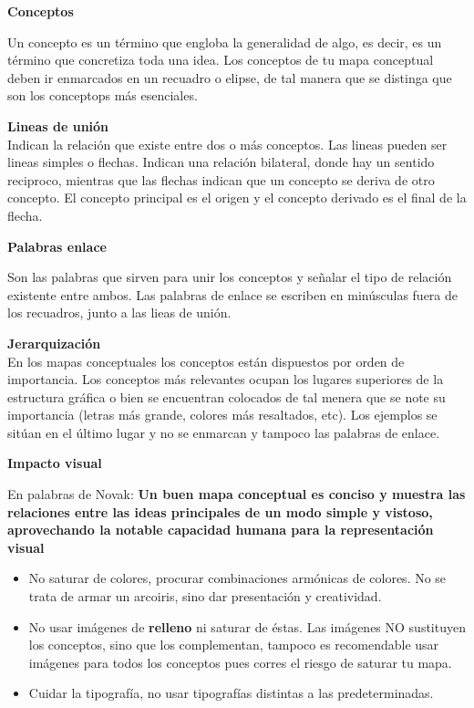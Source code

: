 \documentclass[
	11pt, %
]{beamer}
\begin{document}
\begin{frame}
  \textbf{Conceptos}
  \bigskip %

  Un concepto es un término que engloba la generalidad de algo, es decir, es un término que concretiza toda una idea. Los conceptos de tu mapa conceptual deben ir enmarcados en un recuadro o elipse, de tal manera que se distinga que son los conceptops más esenciales.

  \bigskip %
  \textbf{Lineas de unión}\\
  \bigskip %
  Indican la relación que existe entre dos o más conceptos. Las lineas pueden ser lineas simples o flechas. Indican una relación bilateral, donde hay un sentido reciproco, mientras que las flechas indican que un concepto se deriva de otro concepto. El concepto principal es el origen y el concepto derivado es el final de la flecha.
  
\end{frame}

\begin{frame}
  \textbf{Palabras enlace}
  \bigskip %

  Son las palabras que sirven para unir los conceptos y señalar el tipo de relación existente entre ambos. Las palabras de enlace se escriben en minúsculas fuera de los recuadros, junto a las lieas de unión.

  \bigskip %
  \textbf{Jerarquización}\\
  \bigskip %
  En los mapas conceptuales los conceptos están dispuestos por orden de importancia. Los conceptos más relevantes ocupan los lugares superiores de la estructura gráfica o bien se encuentran colocados de tal menera que se note su importancia (letras más grande, colores más resaltados, etc). Los ejemplos se sitúan en el último lugar y no se enmarcan y tampoco las palabras de enlace.
  
\end{frame}

\begin{frame}
  \textbf{Impacto visual}
  \bigskip %

  En palabras de Novak: \textbf{Un buen mapa conceptual es conciso y muestra las relaciones entre las ideas principales de un modo simple y vistoso, aprovechando la notable capacidad humana para la representación visual}\\

  \begin{itemize}
  \item No saturar de colores, procurar combinaciones armónicas de colores. No se trata de armar un arcoiris, sino dar presentación y creatividad.
  \item No usar imágenes de \textbf{relleno} ni saturar de éstas. Las imágenes NO sustituyen los conceptos, sino que los complementan, tampoco es recomendable usar imágenes para todos los conceptos pues corres el riesgo de saturar tu mapa.
  \item Cuidar la tipografía, no usar tipografías distintas a las predeterminadas. 
  \end{itemize}
\end{frame}
\end{document}
